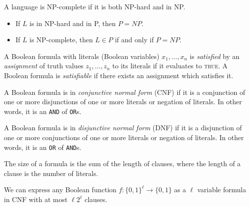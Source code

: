 \begin{defn}
    A language is NP-complete if it is both NP-hard and in NP.
\end{defn}

\begin{thm}\proofbreak
    \begin{itemize}
        \item If $L$ is in NP-hard and in P, then $P = NP$.
        \item If $L$ is NP-complete, then $L \in P$ if and only if $P = NP$.
    \end{itemize}
\end{thm}

\begin{defn}
    A Boolean formula with literals (Boolean variables) $x_1, \ldots, x_n $ is \emph{satisfied} by an \emph{assignment} of truth values $z_1, \ldots, z_n$ to its literals if it evaluates to \textsc{true}. A Boolean formula is \emph{satisfiable} if there exists an assignment which satisfies it.
\end{defn}

\begin{defn}
    A Boolean formula is in \emph{conjunctive normal form} (CNF) if it is a conjunction of one or more disjunctions of one or more literals or negation of literals. In other words, it is an \verb|AND| of \verb|OR|s.

    A Boolean formula is in \emph{disjunctive normal form} (DNF) if it is a disjunction of one or more conjunctions of one or more literals or negation of literals. In other words, it is an \verb|OR| of \verb|AND|s.

    The size of a formula is the sum of the length of clauses, where the length of a clause is the number of literals.
\end{defn}

\begin{lemma}\label{function-to-cnf}
    We can express any Boolean function $f: \{0, 1\}^{\ell} \to \{0, 1\}$ as a $\ell$ variable formula in CNF with at most $\ell 2^{\ell}$ clauses.
\end{lemma}

